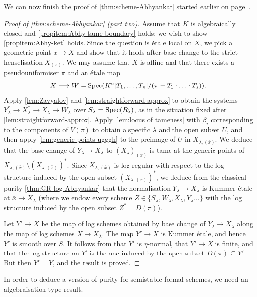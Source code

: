 We can now finish the proof of \cref{thm:scheme-Abhyankar} started earlier on page~\pageref{proof:scheme-Abhyankar}.

\begin{proof}[Proof of \cref{thm:scheme-Abhyankar} (part two)]
Assume that $K$ is algebraically closed and \ref{propitem:Abhy-tame-boundary} holds; we wish to show \ref{propitem:Abhy-ket} holds. Since the question is \'etale local on $X$, we pick a geometric point $\bar x\to X$ and show that it holds after base change to the strict henselisation  $X_{(\bar x)}$. We may assume that $X$ is affine and that there exists a pseudouniformiser $\pi$ and an \'etale map 
\[
    X\longrightarrow W=\operatorname{Spec}(K^\circ[T_1,\dots, T_n]/(\pi-T_1\cdot\ldots\cdot T_s)).
\]
Apply \cref{lem:Zavyalov} and \cref{lem:straightforward-approx} to obtain the systems $Y^*_\lambda\to X_\lambda^*\to X_\lambda\to W_\lambda$ over $S_\lambda=\operatorname{Spec}(R_\lambda)$, as in the situation fixed after \cref{lem:straightforward-approx}. Apply \cref{lem:locus of tameness} with $\beta_i$ corresponding to the components of $V(\pi)$ to obtain a specific $\lambda$ and the open subset $U$, and then apply \cref{lem:generic-points-ugggh} to the preimage of $U$ in $X_{\lambda,(\bar x)}$. We deduce that the base change of $Y_\lambda\to X_\lambda$ to $(X_\lambda)_{(\bar x)}$ is tame at the generic points of $X_{\lambda,(\bar x)} \setminus (X_{\lambda,(\bar x)})^*$. Since $X_{\lambda,(\bar x)}$ is log regular with respect to the log structure induced by the open subset $(X_{\lambda,(\bar x)})^*$, we deduce from the classical purity \cref{thm:GR-log-Abhyankar} that the normalisation $Y_\lambda\to X_\lambda$ is Kummer \'etale at $\bar x\to X_\lambda$ (where we endow every scheme $Z\in \{S_\lambda, W_\lambda, X_\lambda, Y_\lambda \dots\}$ with the log structure induced by the open subset $Z^* = D(\pi)$). 

Let $Y'\to X$ be the map of log schemes obtained by base change of $Y_\lambda\to X_\lambda$ along the map of log schemes $X\to X_\lambda$. The map $Y'\to X$ is Kummer \'etale, and hence $Y'$ is smooth over $S$. It follows from \cite[5.3.1, 5.3.4, and 5.3.7]{AHLS-Log} that $Y'$ is $\eta$-normal, that $Y'\to X$ is finite, and that the log structure on $Y'$ is the one induced by the open subset $D(\pi)\subseteq Y'$. But then $Y'=Y$, and the result is proved.
\end{proof}

In order to deduce a version of purity for semistable formal schemes, we need an algebraisation-type result. 

